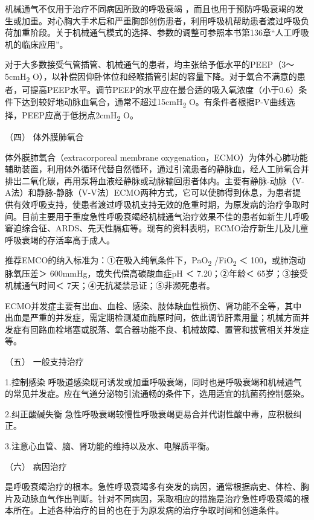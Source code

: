 机械通气不仅用于治疗不同病因所致的呼吸衰竭
，而且也用于预防呼吸衰竭的发生或加重。对心胸大手术后和严重胸部创伤患者，利用呼吸机帮助患者渡过呼吸负荷加重阶段。关于机械通气模式的选择、参数的调整可参照本书第136章“人工呼吸机的临床应用”。

对于大多数接受气管插管、机械通气的患者，均主张给予低水平的PEEP（3～5cmH\textsubscript{2}
O），以补偿因仰卧体位和经喉插管引起的容量下降。对于氧合不满意的患者，可提高PEEP水平。调节PEEP的水平应在最合适的吸入氧浓度（小于0.6）条件下达到较好地动脉血氧合，通常不超过15cmH\textsubscript{2}
O。有条件者根据P-V曲线选择，PEEP应高于低拐点2cmH\textsubscript{2} O。

\hypertarget{text00076.htmlux5cux23CHP3-4-3-1-4}{}
（四） 体外膜肺氧合

体外膜肺氧合（extracorporeal membrane
oxygenation，ECMO）为体外心肺功能辅助装置，利用体外循环代替自然循环，通过引流患者的静脉血，经人工肺氧合并排出二氧化碳，再用泵将血液经静脉或动脉输回患者体内。主要有静脉-动脉（V-A法）和静脉-静脉（V-V法）ECMO两种方式，它可以使肺得到休息，为患者提供有效呼吸支持，使患者渡过呼吸机支持无效的危重时期，为原发病的治疗争取时间。目前主要用于重度急性呼吸衰竭经机械通气治疗效果不佳的患者如新生儿呼吸窘迫综合征、ARDS、先天性膈疝等。现有的资料表明，ECMO治疗新生儿及儿童呼吸衰竭的存活率高于成人。

推荐EMCO的纳入标准为：①在吸入纯氧条件下，PaO\textsubscript{2}
/FiO\textsubscript{2} ＜ 100，或肺泡动脉氧压差＞
600mmHg，或失代偿高碳酸血症pH ＜ 7.20；②年龄＜ 65岁；③接受机械通气时间＜
7天；④无抗凝禁忌证；⑤非濒死患者。

ECMO并发症主要有出血、血栓、感染、肢体缺血性损伤、肾功能不全等，其中出血是严重的并发症，需定期检测凝血酶原时间，依此调节肝素用量；机械方面并发症有回路血栓堵塞或脱落、氧合器功能不良、机械故障、置管和拔管相关并发症等。

\hypertarget{text00076.htmlux5cux23CHP3-4-3-1-5}{}
（五） 一般支持治疗

1.控制感染
呼吸道感染既可诱发或加重呼吸衰竭，同时也是呼吸衰竭和机械通气的常见并发症。应在气道分泌物引流通畅的条件下，选用适宜的抗菌药控制感染。

2.纠正酸碱失衡
急性呼吸衰竭较慢性呼吸衰竭更易合并代谢性酸中毒，应积极纠正。

3.注意心血管、脑、肾功能的维持以及水、电解质平衡。

\hypertarget{text00076.htmlux5cux23CHP3-4-3-1-6}{}
（六） 病因治疗

是呼吸衰竭治疗的根本。急性呼吸衰竭多有突发的病因，通常根据病史、体检、胸片及动脉血气作出判断。针对不同病因，采取相应的措施是治疗急性呼吸衰竭的根本所在。上述各种治疗的目的也在于为原发病的治疗争取时间和创造条件。

